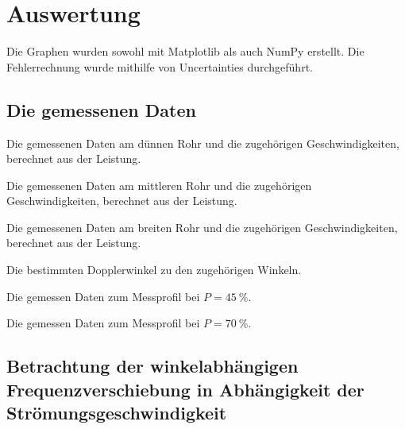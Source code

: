 \section{Auswertung}
\label{sec:Auswertung}


Die Graphen wurden sowohl mit Matplotlib \cite{matplotlib} als auch NumPy \cite{numpy} erstellt. Die
Fehlerrechnung wurde mithilfe von Uncertainties \cite{uncertainties} durchgeführt.

\subsection{Die gemessenen Daten}

\begin{table}
 \centering
 \caption{Die gemessenen Daten am dünnen Rohr und die zugehörigen Geschwindigkeiten, berechnet aus der Leistung.}
 
 \label{tab:k}
\end{table}

\begin{table}
 \centering
 \caption{Die gemessenen Daten am mittleren Rohr und die zugehörigen Geschwindigkeiten, berechnet aus der Leistung.}
 
 \label{tab:m}
\end{table}

\begin{table}
 \centering
 \caption{Die gemessenen Daten am breiten Rohr und die zugehörigen Geschwindigkeiten, berechnet aus der Leistung.}
 
 \label{tab:b}
\end{table}

\begin{table}
 \centering
 \caption{Die bestimmten Dopplerwinkel zu den zugehörigen Winkeln.}
 
 \label{tab:dopplerwinkel}
\end{table}

\begin{table}
 \centering
 \caption{Die gemessen Daten zum Messprofil bei $P = \SI{45}{\percent}$.}
 
 \label{tab:mtief45}
\end{table}

\begin{table}
 \centering
 \caption{Die gemessen Daten zum Messprofil bei $P = \SI{70}{\percent}$.}
 
 \label{tab:mtief70}
\end{table}

\subsection{Betrachtung der winkelabhängigen Frequenzverschiebung in Abhängigkeit der Strömungsgeschwindigkeit}

